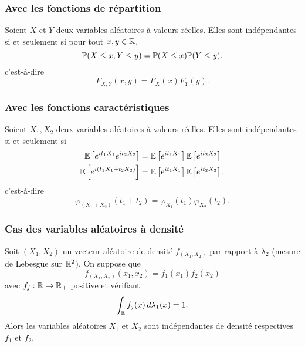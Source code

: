 \subsubsection*{Avec les fonctions de répartition}\label{subsubsection:fonctions_de_repartition}
\setcounter{subsubsection}{2}
Soient \(X\) et \(Y\) deux variables aléatoires à valeurs réelles. Elles sont indépendantes
si et seulement si pour tout \(x,y\in\mathbb{R}\),
\begin{equation*}
    \mathbb{P}(X\leq x, Y\leq y) = \mathbb{P}(X\leq x)\mathbb{P}(Y\leq y).
\end{equation*}
c'est-à-dire
\begin{equation*}
    F_{X,Y}(x,y) = F_X(x)F_Y(y).
\end{equation*}

\subsubsection*{Avec les fonctions caractéristiques}\label{subsubsection:fonctions_caracteristiques}
\setcounter{subsubsection}{3}
Soient \(X_1, X_2\) deux variables aléatoires à valeurs réelles. Elles sont indépendantes
si et seulement si
\begin{equation*}
    \begin{aligned}
        \mathbb{E}\left[ e^{it_1X_1}e^{it_2X_2} \right] &= \mathbb{E}\left[ e^{it_1X_1} \right]\mathbb{E}\left[ e^{it_2X_2} \right]\\
        \mathbb{E}\left[ e^{i(t_1X_1+t_2X_2)} \right] &= \mathbb{E}\left[ e^{it_1X_1} \right]\mathbb{E}\left[ e^{it_2X_2} \right].
    \end{aligned}
\end{equation*}
c'est-à-dire
\begin{equation*}
    \varphi_{(X_1+X_2)}(t_1+t_2) = \varphi_{X_1}(t_1)\varphi_{X_2}(t_2).
\end{equation*}

\subsubsection*{Cas des variables aléatoires à densité}\label{subsubsection:densite}
\setcounter{subsubsection}{4}
Soit \((X_1,X_2)\) un vecteur aléatoire de densité \(f_{(X_1,X_2)}\)
par rapport à \(\lambda_2\) (mesure de Lebesgue sur \(\mathbb{R}^2\)). On suppose que
\begin{equation*}
    f_{(X_1,X_2)}(x_1,x_2) = f_1(x_1)f_2(x_2)
\end{equation*}
avec \(f_j:\mathbb{R}\to\mathbb{R}_+\) positive et vérifiant
\begin{equation*}
    \int_{\mathbb{R}} f_j(x)\mathop{}\!{d}\lambda_1(x) = 1.
\end{equation*}
Alors les variables aléatoires \(X_1\) et \(X_2\) sont indépendantes de densité
respectives \(f_1\) et \(f_2\).

